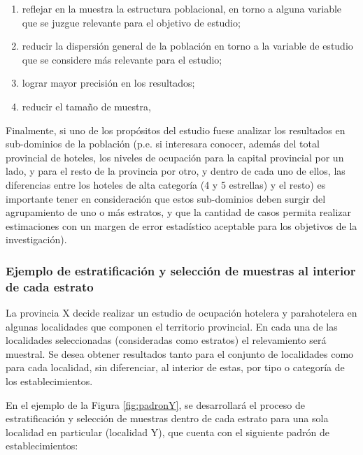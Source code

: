 \documentclass[
]{book}
\begin{document}
\begin{enumerate}
\def\labelenumi{\alph{enumi})}
\item
  reflejar en la muestra la estructura poblacional, en torno a alguna variable que se juzgue relevante para el objetivo de estudio;
\item
  reducir la dispersión general de la población en torno a la variable de estudio que se considere más relevante para el estudio;
\item
  lograr mayor precisión en los resultados;
\item
  reducir el tamaño de muestra,
\end{enumerate}

Finalmente, si uno de los propósitos del estudio fuese analizar los resultados en sub-dominios de la población (p.e. si interesara conocer, además del total provincial de hoteles, los niveles de ocupación para la capital provincial por un lado, y para el resto de la provincia por otro, y dentro de cada uno de ellos, las diferencias entre los hoteles de alta categoría (4 y 5 estrellas) y el resto) es importante tener en consideración que estos sub-dominios deben surgir del agrupamiento de uno o más estratos, y que la cantidad de casos permita realizar estimaciones con un margen de error estadístico aceptable para los objetivos de la investigación).

\hypertarget{ejemplo-de-estratificaciuxf3n-y-selecciuxf3n-de-muestras-al-interior-de-cada-estrato}{%
\subsubsection{Ejemplo de estratificación y selección de muestras al interior de cada estrato}\label{ejemplo-de-estratificaciuxf3n-y-selecciuxf3n-de-muestras-al-interior-de-cada-estrato}}

La provincia X decide realizar un estudio de ocupación hotelera y parahotelera en algunas localidades que componen el territorio provincial. En cada una de las localidades seleccionadas (consideradas como estratos) el relevamiento será muestral. Se desea obtener resultados tanto para el conjunto de localidades como para cada localidad, sin diferenciar, al interior de estas, por tipo o categoría de los establecimientos.

En el ejemplo de la Figura \ref{fig:padronY}, se desarrollará el proceso de estratificación y selección de muestras dentro de cada estrato para una sola localidad en particular (localidad Y), que cuenta con el siguiente padrón de establecimientos:
\end{document}
